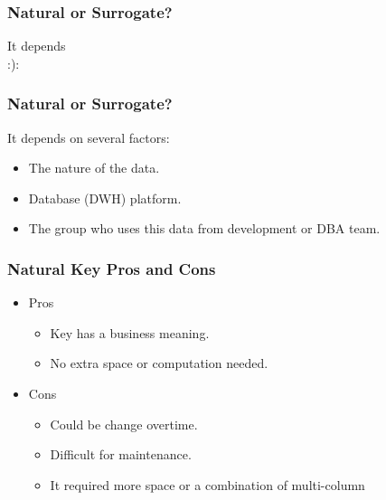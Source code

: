\begin{frame}
	\frametitle{Natural or Surrogate?}
	\vspace{2.6cm}
\begin{center}
	\hspace{1.5cm}	{\Huge It depends \\
	\hspace{1.5cm}			:):}
\end{center}
\end{frame}
\begin{frame}
	\frametitle{Natural or Surrogate?}
	\vspace{1cm}
	It depends on several factors:
		\begin{itemize}[<+->]
			\item The nature of the data.
			\item Database (DWH) platform.
			\item The group who uses this data from development or DBA team.		
		\end{itemize}		
\end{frame}
\begin{frame}
	\frametitle{Natural Key Pros and Cons}

	\hspace{.5cm}
	\begin{itemize}
		\item	Pros
		\begin{itemize}
			\item Key has a business meaning.
			\item No extra space or computation needed.
		\end{itemize}	
	\end{itemize}

\begin{itemize}
		\item	Cons
		\begin{itemize}
			\item Could be change overtime.
			\item Difficult for maintenance.
			\item It required more space or a combination of multi-column
		\end{itemize}	
	\end{itemize}	

\end{frame}
